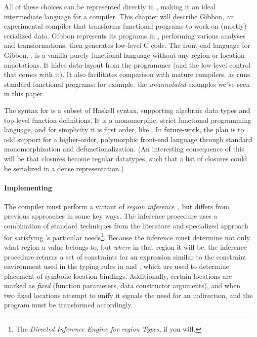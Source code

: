     All of these choices can be represented directly in \ourcalc, making it an
    ideal intermediate language for a compiler. This chapter will describe Gibbon,
    an experimental compiler that transforms functional programs to work on
    (mostly) serialized data. Gibbon represents its programs in \ourcalc,
    performing various analyses and transformations, then generates low-level C code.
%
The front-end language for Gibbon, \lamadt, is a vanilla purely functional
language without any region or location
annotations.  It hides data-layout from the programmer (and the low-level
control that comes with it).  It also facilitates comparison with
mature compilers, as \lamadt runs standard functional programs:
for example, the {\em unannotated} examples we've seen in this paper.

{The syntax for \lamadt is a subset of Haskell syntax, supporting
  algebraic data types and top-level function definitions. It is a
  monomorphic, strict functional programming language, and for
  simplicity it is first order, like \ourcalc.}
{In future-work, the plan is to add support for a higher-order, polymorphic
  front-end language through standard monomorphization and defunctionalization.
  (An interesting consequence of this will be that closures become regular
  datatypes, such that a list of closures could be serialized in a dense
  representation.)}

%

\paragraph{Implementing \lamadt}
The compiler must perform a variant of {\em region
  inference}~\cite{regioncalcs,mlkit-retrospective}, but differs from
previous approaches in some key ways.
%
The inference procedure uses a combination of standard techniques from the literature and specialized
approach for satisfying \ourcalc's particular needs\footnote{The {\em
    Directed Inference Engine for region Types}, if you will.}.
%
Because the inference must determine not only what region a value belongs to,
but \emph{where} in that region it will be, the inference procedure returns a
set of constraints for an expression similar to the constraint environment used
in the typing rules in  and , which are
used to determine placement of symbolic location bindings. Additionally, certain
locations are marked as \emph{fixed} (function parameters, data constructor
arguments), and when two fixed locations attempt to unify it signals the need
for an indirection, and the program must be transformed accordingly.

